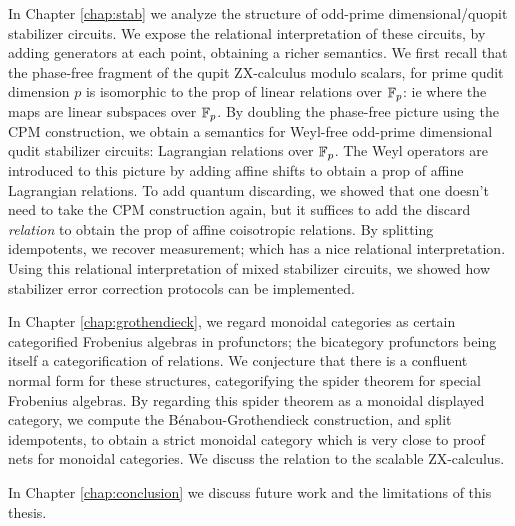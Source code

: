 \documentclass[12pt]{ociamthesis}  %
\begin{document}
In Chapter \ref{chap:stab}  we analyze the structure of odd-prime dimensional/quopit stabilizer circuits.
We expose the relational interpretation of these circuits, by adding generators at each point, obtaining a richer semantics.  We first recall that the phase-free fragment of the qupit ZX-calculus modulo scalars, for prime qudit dimension $p$ is isomorphic to the prop of linear relations over $\mathbb{F}_p$: ie where the maps are linear subspaces over $\mathbb{F}_p$.  By doubling the phase-free picture using the CPM construction, we obtain a semantics for Weyl-free odd-prime dimensional qudit stabilizer circuits: Lagrangian relations over $\mathbb{F}_p$.  The Weyl operators are introduced to this picture by adding affine shifts to obtain a prop of affine Lagrangian relations. To add quantum discarding, we showed that one doesn't need to take the CPM construction again, but it suffices to add the discard {\em relation} to obtain the prop of affine coisotropic relations.  By splitting idempotents, we recover measurement; which has a nice relational interpretation.  Using this relational interpretation of mixed stabilizer circuits, we showed how stabilizer error correction protocols can be implemented.


In Chapter \ref{chap:grothendieck}, we regard monoidal categories as certain categorified Frobenius algebras in profunctors; the bicategory profunctors being itself a categorification of relations.  We conjecture that there is a confluent normal form for these structures, categorifying the spider theorem for special Frobenius algebras.  By regarding this spider theorem as a monoidal displayed category, we compute the B\'enabou-Grothendieck construction, and split idempotents, to obtain a strict monoidal category which is very close to proof nets for monoidal categories. We discuss the relation to the scalable ZX-calculus.

In Chapter \ref{chap:conclusion} we discuss future work and the limitations of this thesis.
\end{document}
